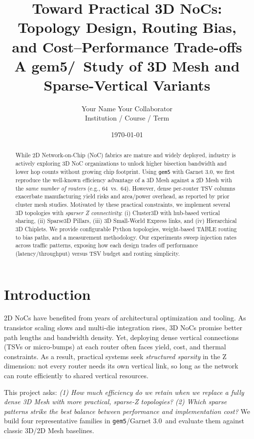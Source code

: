 \documentclass[11pt]{article}
\title{\textbf{Toward Practical 3D NoCs: Topology Design, Routing Bias, and Cost--Performance Trade-offs}\\
\large A gem5/\Ruby\ Study of 3D Mesh and Sparse-Vertical Variants}
\author{Your Name \quad Your Collaborator\\[2pt]
\small Institution / Course / Term}
\date{\today}
\newcommand{\NumRoutersA}{64}         %
\newcommand{\NumRoutersB}{64}         %
\newcommand{\Ruby}{Garnet 3.0}
\begin{document}
\maketitle
\doublespacing

\begin{abstract}
While 2D Network-on-Chip (NoC) fabrics are mature and widely deployed, industry is actively exploring 3D NoC organizations to unlock higher bisection bandwidth and lower hop counts without growing chip footprint. Using \texttt{gem5} with \Ruby, we first reproduce the well-known efficiency advantage of a 3D Mesh against a 2D Mesh with the \emph{same number of routers} (e.g., \NumRoutersA\ vs.\ \NumRoutersB). However, dense per-router TSV columns exacerbate manufacturing yield risks and area/power overhead, as reported by prior cluster mesh studies. Motivated by these practical constraints, we implement several 3D topologies with \emph{sparser Z connectivity}: (i) Cluster3D with hub-based vertical sharing, (ii) Sparse3D Pillars, (iii) 3D Small-World Express links, and (iv) Hierarchical 3D Chiplets. We provide configurable Python topologies, weight-based TABLE routing to bias paths, and a measurement methodology. Our experiments sweep injection rates across traffic patterns, exposing how each design trades off performance (latency/throughput) versus TSV budget and routing simplicity. 
\end{abstract}

\section{Introduction}
2D NoCs have benefited from years of architectural optimization and tooling. As transistor scaling slows and multi-die integration rises, 3D NoCs promise better path lengths and bandwidth density. Yet, deploying dense vertical connections (TSVs or micro-bumps) at each router often faces yield, cost, and thermal constraints. As a result, practical systems seek \emph{structured sparsity} in the Z dimension: not every router needs its own vertical link, so long as the network can route efficiently to shared vertical resources.

This project asks: \emph{(1) How much efficiency do we retain when we replace a fully dense 3D Mesh with more practical, sparse-Z topologies? (2) Which sparse patterns strike the best balance between performance and implementation cost?} We build four representative families in \texttt{gem5}/\Ruby\ and evaluate them against classic 3D/2D Mesh baselines.
\end{document}
